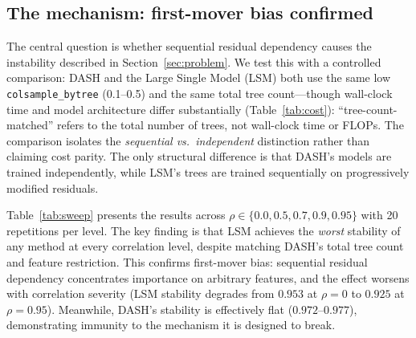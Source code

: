 \documentclass[11pt]{article}
\newcommand{\dash}{\textsc{DASH}}
\newcommand{\rhovar}{\rho}
\begin{document}
\subsection{The mechanism: first-mover bias confirmed}
\label{sec:mechanism_result}

The central question is whether sequential residual dependency causes
the instability described in Section~\ref{sec:problem}. We test this
with a controlled comparison: \dash{} and the Large Single Model (LSM)
both use the same low \texttt{colsample\_bytree} (0.1--0.5) and the same
total tree count---though wall-clock time and model architecture differ
substantially (Table~\ref{tab:cost}): ``tree-count-matched'' refers to
the total number of trees, not wall-clock time or FLOPs. The comparison isolates the
\emph{sequential vs.\ independent} distinction rather than claiming
cost parity. The only structural difference is that \dash{}'s models
are trained independently, while LSM's trees are trained sequentially
on progressively modified residuals.

Table~\ref{tab:sweep} presents the results across
$\rhovar \in \{0.0, 0.5, 0.7, 0.9, 0.95\}$ with 20 repetitions per
level. The key finding is that LSM achieves the \emph{worst}
stability of any method at every correlation level, despite matching
\dash{}'s total tree count and feature restriction. This confirms
first-mover bias: sequential residual dependency concentrates
importance on arbitrary features, and the effect worsens with
correlation severity (LSM stability degrades from $0.953$ at
$\rhovar = 0$ to $0.925$ at $\rhovar = 0.95$). Meanwhile, \dash{}'s
stability is effectively flat ($0.972$--$0.977$), demonstrating
immunity to the mechanism it is designed to break.
\end{document}
